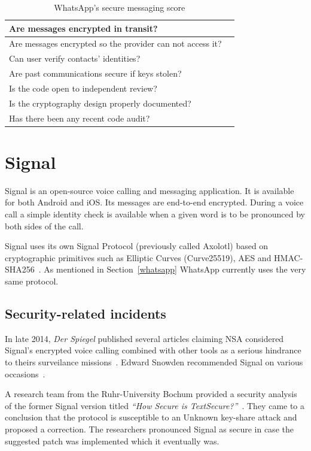 \documentclass[thesis=M,english]{FITthesis}[2012/10/20]
\newcommand{\cmark}{\ding{51}}%
\newcommand{\xmark}{\ding{55}}%
\begin{document}
\begin{table}[htb]
	\centering
	\caption{WhatsApp's secure messaging score}
	\label{my-label}
	\begin{tabular}{|l|l|}
		\hline
		Are messages encrypted in transit? & \cmark \\\hline
		Are messages encrypted so the provider can not access it? & \cmark \\ \hline
		Can user verify contacts' identities? & \cmark \\ \hline
		Are past communications secure if keys stolen? & \cmark \\ \hline
		Is the code open to independent review? & \xmark \\ \hline
		Is the cryptography design properly documented? & \cmark \\ \hline
		Has there been any recent code audit? & \cmark \\ \hline
	\end{tabular}
\end{table}


\section{Signal}

Signal is an open-source voice calling and messaging application. It is available for both Android and iOS. Its messages are end-to-end encrypted. During a voice call a simple identity check is available when a given word is to be pronounced by both sides of the call.

Signal uses its own Signal Protocol (previously called Axolotl) based on cryptographic primitives such as Elliptic Curves (Curve25519), AES and HMAC-SHA256~\cite{signal-bochum}. As mentioned in Section~\ref{whatsapp} WhatsApp currently uses the very same protocol.

\subsection{Security-related incidents}

In late 2014, \emph{Der Spiegel} published several articles claiming NSA considered Signal's encrypted voice calling combined with other tools as a serious hindrance to theirs surveilance missions~\cite{signal-spiegel}. Edward Snowden recommended Signal on various occasions~\cite{signal-snowden,signal-snowden2}.

A research team from the Ruhr-University Bochum provided a security analysis of the former Signal version titled \emph{``How Secure is TextSecure?''}~\cite{signal-bochum}. They came to a conclusion that the protocol is susceptible to an Unknown key-share attack and proposed a correction. The researchers pronounced Signal as secure in case the suggested patch was implemented which it eventually was.
\end{document}
